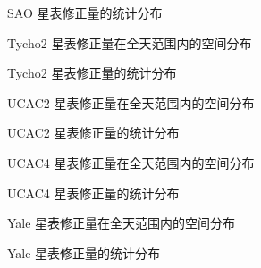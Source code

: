 \documentclass{aastex701}
\begin{document}
\begin{figure}[ht!]
\caption{SAO 星表修正量的统计分布}
\label{fig:hist_sao}
\end{figure}

\begin{figure}[ht!]
\caption{Tycho2 星表修正量在全天范围内的空间分布}
\label{fig:bias_tycho2_2x2}
\end{figure}

\begin{figure}[ht!]
\caption{Tycho2 星表修正量的统计分布}
\label{fig:hist_tycho2}
\end{figure}

\begin{figure}[ht!]
\caption{UCAC2 星表修正量在全天范围内的空间分布}
\label{fig:bias_ucac2_2x2}
\end{figure}

\begin{figure}[ht!]
\caption{UCAC2 星表修正量的统计分布}
\label{fig:hist_ucac2}
\end{figure}

\begin{figure}[ht!]
\caption{UCAC4 星表修正量在全天范围内的空间分布}
\label{fig:bias_ucac4_2x2}
\end{figure}

\begin{figure}[ht!]
\caption{UCAC4 星表修正量的统计分布}
\label{fig:hist_ucac4}
\end{figure}

\begin{figure}[ht!]
\caption{Yale 星表修正量在全天范围内的空间分布}
\label{fig:bias_yale_2x2}
\end{figure}

\begin{figure}[ht!]
\caption{Yale 星表修正量的统计分布}
\label{fig:hist_yale}
\end{figure}
\end{document}

